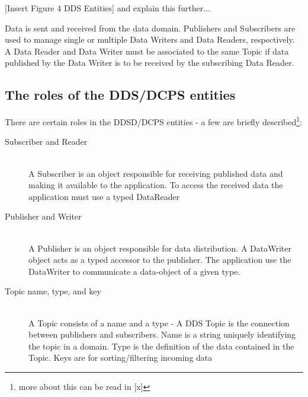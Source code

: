 	[Insert Figure 4 DDS Entities] and explain this further...

Data is sent and received from the data domain. Publishers and Subscribers are used to manage
single or multiple Data Writers and Data Readers, respectively. A Data Reader and Data Writer
must be associated to the same Topic if data published by the Data Writer is to be received by the
subscribing Data Reader.
	
\subsection{The roles of the DDS/DCPS entities}
There are certain roles in the DDSD/DCPS entities - a few are briefly described\footnote{more about this can be read in [x]}:

\begin{description}
\item[Subscriber and Reader] \hfill \\
A Subscriber is an object responsible for receiving published data
and making it available to the application.
To access the received data the application must use a typed DataReader

\item[Publisher and Writer] \hfill \\
A Publisher is an object responsible for data distribution.
A DataWriter object acts as a typed accessor to the publisher.
The application use the DataWriter to communicate a data-object of a given type.

\item[Topic name, type, and key] \hfill \\
A Topic consists of a name and a type - A DDS Topic is the connection between publishers and subscribers.
Name is a string uniquely identifying the topic in a domain.
Type is the definition of the data contained in the Topic.
Keys are for sorting/filtering incoming data 
\end{description}